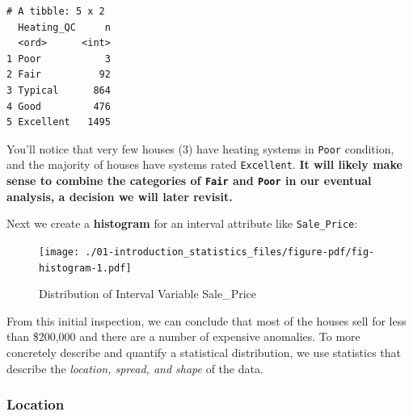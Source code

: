 \documentclass[
  letterpaper,
  DIV=11,
  numbers=noendperiod]{scrreprt}
\newenvironment{Shaded}{\begin{snugshade}}{\end{snugshade}}
\newcommand{\AttributeTok}[1]{\textcolor[rgb]{0.40,0.45,0.13}{#1}}
\newcommand{\DecValTok}[1]{\textcolor[rgb]{0.68,0.00,0.00}{#1}}
\newcommand{\FunctionTok}[1]{\textcolor[rgb]{0.28,0.35,0.67}{#1}}
\newcommand{\NormalTok}[1]{\textcolor[rgb]{0.00,0.23,0.31}{#1}}
\newcommand{\SpecialCharTok}[1]{\textcolor[rgb]{0.37,0.37,0.37}{#1}}
\newcommand{\StringTok}[1]{\textcolor[rgb]{0.13,0.47,0.30}{#1}}
\begin{document}
\begin{verbatim}
# A tibble: 5 x 2
  Heating_QC     n
  <ord>      <int>
1 Poor           3
2 Fair          92
3 Typical      864
4 Good         476
5 Excellent   1495
\end{verbatim}

You'll notice that very few houses (3) have heating systems in
\texttt{Poor} condition, and the majority of houses have systems rated
\texttt{Excellent}. \textbf{It will likely make sense to combine the
categories of \texttt{Fair} and \texttt{Poor} in our eventual analysis,
a decision we will later revisit.}

Next we create a \textbf{histogram} for an interval attribute like
\texttt{Sale\_Price}:

\begin{Shaded}
\end{Shaded}

\begin{figure}[H]

{\centering \texttt{[image: ./01-introduction\_statistics\_files/figure-pdf/fig-histogram-1.pdf]}

}

\caption{\label{fig-histogram}Distribution of Interval Variable
Sale\_Price}

\end{figure}

From this initial inspection, we can conclude that most of the houses
sell for less than \$200,000 and there are a number of expensive
anomalies. To more concretely describe and quantify a statistical
distribution, we use statistics that describe the \emph{location,
spread, and shape} of the data.

\hypertarget{location}{%
\subsubsection*{Location}\label{location}}
\end{document}
